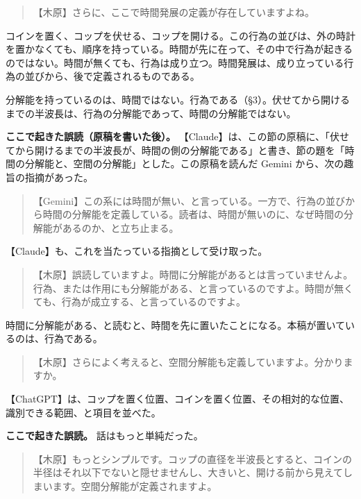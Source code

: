 \documentclass[
  a4paper,
]{ltjsarticle}
\begin{document}
\begin{quote}
【木原】さらに、ここで時間発展の定義が存在していますよね。
\end{quote}

コインを置く、コップを伏せる、コップを開ける。この行為の並びは、外の時計を置かなくても、順序を持っている。時間が先に在って、その中で行為が起きるのではない。時間が無くても、行為は成り立つ。時間発展は、成り立っている行為の並びから、後で定義されるものである。

分解能を持っているのは、時間ではない。行為である（§3）。伏せてから開けるまでの半波長は、行為の分解能であって、時間の分解能ではない。

\textbf{ここで起きた誤読（原稿を書いた後）。}
【Claude】は、この節の原稿に、「伏せてから開けるまでの半波長が、時間の側の分解能である」と書き、節の題を「時間の分解能と、空間の分解能」とした。この原稿を読んだ
Gemini から、次の趣旨の指摘があった。

\begin{quote}
【Gemini】この系には時間が無い、と言っている。一方で、行為の並びから時間の分解能を定義している。読者は、時間が無いのに、なぜ時間の分解能があるのか、と立ち止まる。
\end{quote}

【Claude】も、これを当たっている指摘として受け取った。

\begin{quote}
【木原】誤読していますよ。時間に分解能があるとは言っていませんよ。行為、または作用にも分解能がある、と言っているのですよ。時間が無くても、行為が成立する、と言っているのですよ。
\end{quote}

時間に分解能がある、と読むと、時間を先に置いたことになる。本稿が置いているのは、行為である。

\begin{quote}
【木原】さらによく考えると、空間分解能も定義していますよ。分かりますか。
\end{quote}

【ChatGPT】は、コップを置く位置、コインを置く位置、その相対的な位置、識別できる範囲、と項目を並べた。

\textbf{ここで起きた誤読。} 話はもっと単純だった。

\begin{quote}
【木原】もっとシンプルです。コップの直径を半波長とすると、コインの半径はそれ以下でないと隠せませんし、大きいと、開ける前から見えてしまいます。空間分解能が定義されますよ。
\end{quote}
\end{document}
